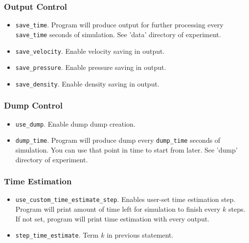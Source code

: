 \subsubsection{Output Control}
\begin{itemize}
    \item \verb|save_time|. Program will produce output for further processing every \verb|save_time| seconds of simulation. See 'data' directory of experiment.
    \item \verb|save_velocity|. Enable velocity saving in output.
    \item \verb|save_pressure|. Enable pressure saving in output.
    \item \verb|save_density|. Enable density saving in output.
\end{itemize}

\subsubsection{Dump Control}
\begin{itemize}
    \item \verb|use_dump|. Enable dump dump creation.
    \item \verb|dump_time|. Program will produce dump every \verb|dump_time| seconds of simulation. You can use that point in time to start from later. See 'dump' directory of experiment.
\end{itemize}

\subsubsection{Time Estimation}
\begin{itemize}
    \item \verb|use_custom_time_estimate_step|. Enables user-set time estimation step. Program will print amount of time left for simulation to finish every $k$ steps. If not set, program will print time estimation with every output.
    \item \verb|step_time_estimate|. Term $k$ in previous statement.
\end{itemize}

